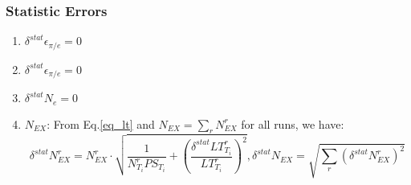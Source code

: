 \documentclass[a4paper,12.pt]{article}
\begin{document}
\subsubsection{Statistic Errors}
\begin{enumerate}

\item $\delta^{stat} \epsilon_{\pi/e} = 0$

\item $\delta^{stat} \epsilon_{\pi/e} = 0$

\item $\delta^{stat} N_{e} = 0$

\item \textbf{$N_{EX}$}: From  Eq.\ref{eq_lt} and $N_{EX}=\sum_{r}N_{EX}^{r}$ for all runs, we have:
\begin{equation}
  \delta^{stat} N_{EX}^{r} = N_{EX}^{r} \cdot \sqrt{\frac{1}{N_{T_{i}}^{r} PS_{T_{i}}} + (\frac{\delta^{stat} LT_{T_{i}}^{r}}{LT_{T_{i}}^{r}})^{2} }, \delta^{stat} N_{EX}=\sqrt{\sum_{r}(\delta^{stat} N_{EX}^{r})^{2}}
\end{equation}

\end{enumerate}
\end{document}
